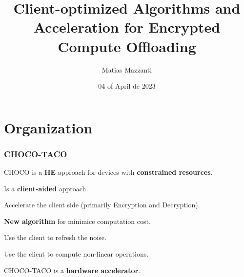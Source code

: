 \documentclass[10pt]{beamer}
\title[CHOCO]{Client-optimized Algorithms and Acceleration for Encrypted Compute Offloading}
\author[Matias Mazzanti]{Matias Mazzanti}
\institute{}
\date{04 of April de 2023}
\begin{document}
\begin{frame}

\maketitle

\end{frame}


\section{Organization}
\begin{frame}
    \frametitle{CHOCO-TACO}

    CHOCO is a \textbf{HE} approach for devices with \textbf{constrained resources}.

    Is a \textbf{client-aided} approach.
\pause

    Accelerate the client side (primarily Encryption and Decryption).

    \textbf{New algorithm} for minimice computation cost.

\pause
    Use the client to refresh the noise.

    Use the client to compute non-linear operations.

    CHOCO-TACO is a \textbf{hardware accelerator}.
\end{frame}
\end{document}
